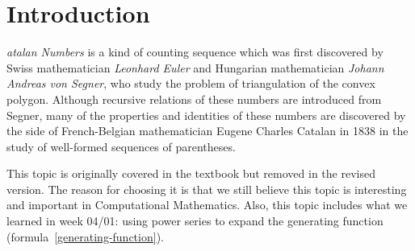 \newpage
\section{Introduction}
\lettrine[findent=2pt]{}{ }\textit{atalan Numbers} is a kind of counting sequence which was first discovered by Swiss mathematician \textit{Leonhard Euler} and Hungarian mathematician \textit{Johann Andreas von Segner}\cite{oconnor2004segner}, who study the problem of triangulation of the convex polygon\cite{mathshistory}. 
Although recursive relations of these numbers are introduced from Segner, many of the properties and identities of these numbers are discovered by the side of French-Belgian mathematician Eugene Charles Catalan in 1838 in the study of well-formed sequences of parentheses.

This topic is originally covered in the textbook but removed in the revised version. The reason for choosing it is that we still believe this topic is interesting and important in Computational Mathematics. Also, this topic includes what we learned in week 04/01: using power series to expand the generating function (formula~\ref{generating-function}).